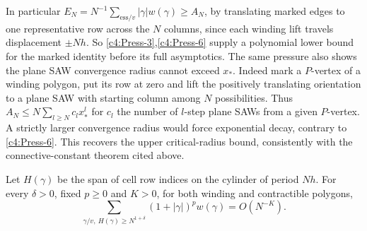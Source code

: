 In particular \(E_N=N^{-1}\sum_{\mathrm{ess}/v}|\gamma|w(\gamma)\ge A_N\), by translating marked edges to one representative row across the \(N\) columns, since each winding lift travels displacement \(\pm Nh\). So \eqref{c4:Press-3},\eqref{c4:Press-6} supply a polynomial lower bound for the marked identity before its full asymptotics. The same pressure also shows the plane SAW convergence radius cannot exceed \(x_*\). Indeed mark a \(P\)-vertex of a winding polygon, put its row at zero and lift the positively translating orientation to a plane SAW with starting column among \(N\) possibilities. Thus \(A_N\le N\sum_{l\ge N}c_l x_*^l\) for \(c_l\) the number of \(l\)-step plane SAWs from a given \(P\)-vertex. A strictly larger convergence radius would force exponential decay, contrary to \eqref{c4:Press-6}. This recovers the upper critical-radius bound, consistently with the connective-constant theorem cited above.

\begin{proposition}\label{prop:thin-cylinder-span}
Let $H(\gamma)$ be the span of cell row indices on the cylinder of period $Nh$. For every $\delta>0$, fixed $p\ge0$ and $K>0$, for both winding and contractible polygons,
\begin{equation}
                   \sum_{\gamma/v,\ H(\gamma)\ge N^{1+\delta}}
                         (1+|\gamma|)^p w(\gamma)=O(N^{-K}) .                 \label{c4:Press-7}
\end{equation}
\end{proposition}

